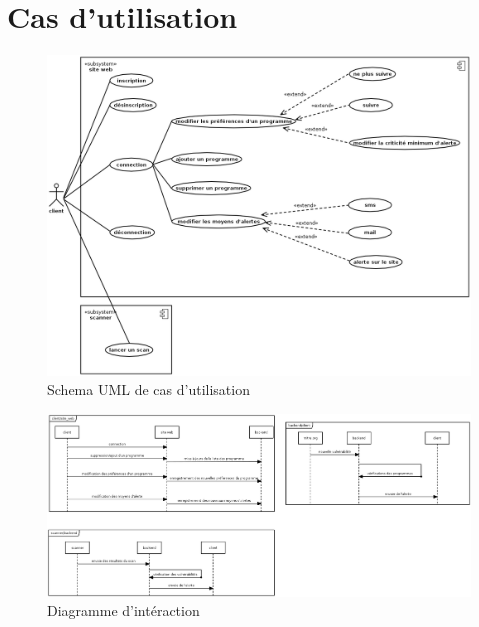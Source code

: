
\section{Cas d’utilisation}
\begin{figure}[!h]
  \caption{Schema UML de cas d'utilisation}
  \centering
  \includegraphics[width=18cm]{uml1.png}
\end{figure}
\begin{figure}[!h]
  \caption{Diagramme d'intéraction}
  \centering
  \includegraphics[width=18cm]{uml2.png}
\end{figure}
\newpage
